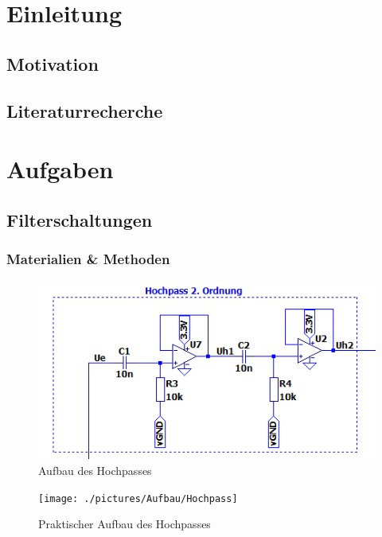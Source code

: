 \clearpage
\section{Einleitung}

\subsection{Motivation}

\subsection{Literaturrecherche}


\clearpage
\section{Aufgaben}

\subsection{Filterschaltungen}

\subsubsection{Materialien \& Methoden}

\begin{figure}[htb]
    \includegraphics[width=14cm]{./pictures/Hochpass}
    \caption{Aufbau des Hochpasses}
    \label{fig:Hochpass}
\end{figure}

\begin{figure}[htb]
    \texttt{[image: ./pictures/Aufbau/Hochpass]}
    \caption{Praktischer Aufbau des Hochpasses}
    \label{fig:HochpassPraktisch}
\end{figure}

